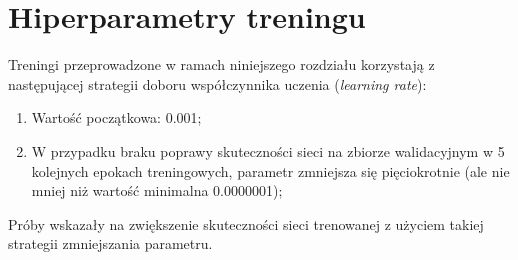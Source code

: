 \section{Hiperparametry treningu}

Treningi przeprowadzone w ramach niniejszego rozdziału korzystają z następującej strategii doboru współczynnika uczenia (\textit{learning rate}):
\begin{enumerate}
  \item Wartość początkowa: 0.001;
  \item W przypadku braku poprawy skuteczności sieci na zbiorze walidacyjnym w 5 kolejnych epokach treningowych, parametr zmniejsza się pięciokrotnie (ale nie mniej niż wartość minimalna 0.0000001);
\end{enumerate}

Próby wskazały na zwiększenie skuteczności sieci trenowanej z użyciem takiej strategii zmniejszania parametru.
